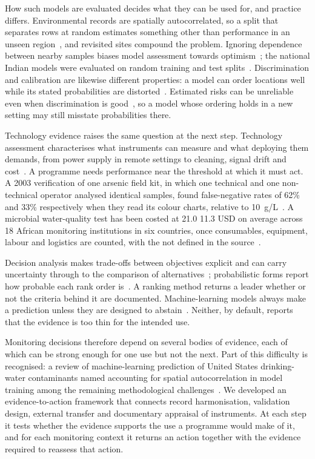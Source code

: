 \documentclass[10pt,letterpaper]{article}
\begin{document}
How such models are evaluated decides what they can be used for, and practice differs. Environmental records are spatially autocorrelated, so a split that separates rows at random estimates something other than performance in an unseen region~\cite{Meyer2019}, and revisited sites compound the problem. Ignoring dependence between nearby samples biases model assessment towards optimism~\cite{MeyerPebesma2022}; the national Indian models were evaluated on random training and test splits~\cite{Podgorski2018,Podgorski2020-IJERPH-India}. Discrimination and calibration are likewise different properties: a model can order locations well while its stated probabilities are distorted~\cite{NiculescuMizil2005}. Estimated risks can be unreliable even when discrimination is good~\cite{VanCalster2019}, so a model whose ordering holds in a new setting may still misstate probabilities there.

Technology evidence raises the same question at the next step. Technology assessment characterises what instruments can measure and what deploying them demands, from power supply in remote settings to cleaning, signal drift and cost~\cite{Andres2018}. A programme needs performance near the threshold at which it must act. A 2003 verification of one arsenic field kit, in which one technical and one non-technical operator analysed identical samples, found false-negative rates of 62\% and 33\% respectively when they read its colour charts, relative to 10~\textmu{}g/L~\cite{EPA-ETV-QuickLowRangeII-2003}. A microbial water-quality test has been costed at 21.0 \textpm{} 11.3 USD on average across 18 African monitoring institutions in six countries, once consumables, equipment, labour and logistics are counted, with the \textpm{} not defined in the source~\cite{Delaire2017}.

Decision analysis makes trade-offs between objectives explicit and can carry uncertainty through to the comparison of alternatives~\cite{Schuwirth2018}; probabilistic forms report how probable each rank order is~\cite{Broekhuizen2015}. A ranking method returns a leader whether or not the criteria behind it are documented. Machine-learning models always make a prediction unless they are designed to abstain~\cite{Hendrickx2024}. Neither, by default, reports that the evidence is too thin for the intended use.

Monitoring decisions therefore depend on several bodies of evidence, each of which can be strong enough for one use but not the next. Part of this difficulty is recognised: a review of machine-learning prediction of United States drinking-water contaminants named accounting for spatial autocorrelation in model training among the remaining methodological challenges~\cite{Hu2023}. We developed an evidence-to-action framework that connects record harmonisation, validation design, external transfer and documentary appraisal of instruments. At each step it tests whether the evidence supports the use a programme would make of it, and for each monitoring context it returns an action together with the evidence required to reassess that action.
\end{document}
